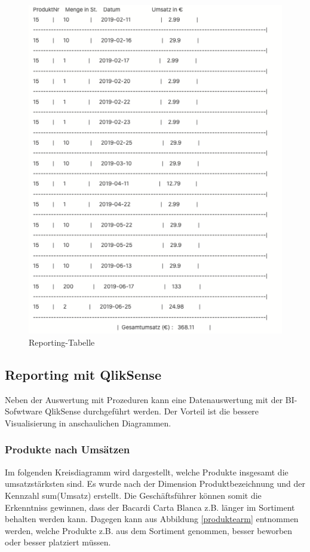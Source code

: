 \begin{figure}[H]
  \centering
  \includegraphics[width=1.1\linewidth]{pictures/report_sql.png}
  \caption{Reporting-Tabelle}
  \label{report_sql}
\end{figure}
\subsection{Reporting mit QlikSense}

Neben der Auswertung mit Prozeduren kann eine Datenauswertung mit der BI-Sofwtware QlikSense durchgeführt werden. Der Vorteil ist die bessere Visualisierung in anschaulichen Diagrammen.

\subsubsection{Produkte nach Umsätzen}

Im folgenden Kreisdiagramm wird dargestellt, welche Produkte insgesamt die umsatzstärksten sind. Es wurde nach der Dimension Produktbezeichnung und der Kennzahl sum(Umsatz) erstellt. Die Geschäftsführer können somit die Erkenntniss gewinnen, dass der Bacardi Carta Blanca z.B. länger im Sortiment behalten werden kann. Dagegen kann aus Abbildung \ref{produktearm} entnommen werden, welche Produkte z.B. aus dem Sortiment genommen, besser beworben oder besser platziert müssen.

